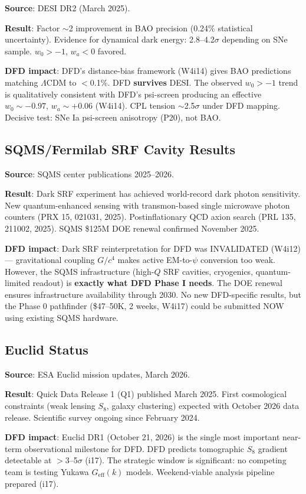 \documentclass[11pt]{article}
\begin{document}
\textbf{Source}: DESI DR2 (March 2025).

\textbf{Result}: Factor $\sim$2 improvement in BAO precision (0.24\% statistical uncertainty). Evidence for dynamical dark energy: 2.8--4.2$\sigma$ depending on SNe sample. $w_0 > -1$, $w_a < 0$ favored.

\textbf{DFD impact}: DFD's distance-bias framework (W4i14) gives BAO predictions matching $\Lambda$CDM to $<$0.1\%. DFD \textbf{survives} DESI. The observed $w_0 > -1$ trend is qualitatively consistent with DFD's psi-screen producing an effective $w_0 \sim -0.97$, $w_a \sim +0.06$ (W4i14). CPL tension $\sim$2.5$\sigma$ under DFD mapping. Decisive test: SNe Ia psi-screen anisotropy (P20), not BAO.

\subsection{SQMS/Fermilab SRF Cavity Results}

\textbf{Source}: SQMS center publications 2025--2026.

\textbf{Result}: Dark SRF experiment has achieved world-record dark photon sensitivity. New quantum-enhanced sensing with transmon-based single microwave photon counters (PRX 15, 021031, 2025). Postinflationary QCD axion search (PRL 135, 211002, 2025). SQMS \$125M DOE renewal confirmed November 2025.

\textbf{DFD impact}: Dark SRF reinterpretation for DFD was INVALIDATED (W4i12) --- gravitational coupling $G/c^4$ makes active EM-to-$\psi$ conversion too weak. However, the SQMS infrastructure (high-$Q$ SRF cavities, cryogenics, quantum-limited readout) is \textbf{exactly what DFD Phase I needs}. The DOE renewal ensures infrastructure availability through 2030. No new DFD-specific results, but the Phase 0 pathfinder (\$47--50K, 2 weeks, W4i17) could be submitted NOW using existing SQMS hardware.

\subsection{Euclid Status}

\textbf{Source}: ESA Euclid mission updates, March 2026.

\textbf{Result}: Quick Data Release 1 (Q1) published March 2025. First cosmological constraints (weak lensing $S_8$, galaxy clustering) expected with October 2026 data release. Scientific survey ongoing since February 2024.

\textbf{DFD impact}: Euclid DR1 (October 21, 2026) is the single most important near-term observational milestone for DFD. DFD predicts tomographic $S_8$ gradient detectable at $>$3--5$\sigma$ (i17). The strategic window is significant: no competing team is testing Yukawa $G_\text{eff}(k)$ models. Weekend-viable analysis pipeline prepared (i17).
\end{document}
